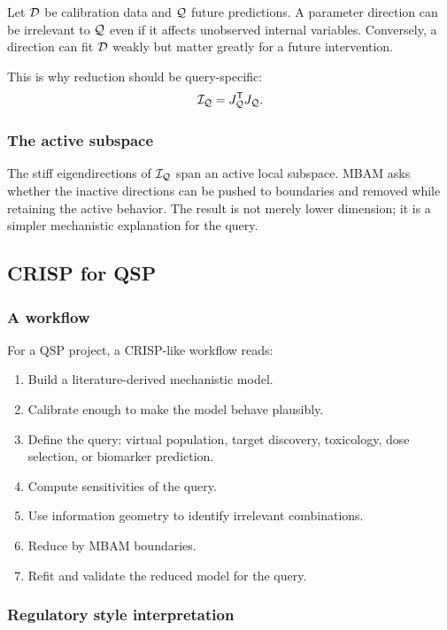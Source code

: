 Let \(\mathcal{D}\) be calibration data and \(\mathcal{Q}\) future predictions.  A parameter direction can be irrelevant to \(\mathcal{Q}\) even if it affects unobserved internal variables.  Conversely, a direction can fit \(\mathcal{D}\) weakly but matter greatly for a future intervention.

This is why reduction should be query-specific:
\[
  \mathcal{I}_{\mathcal{Q}}
  =
  J_{\mathcal{Q}}^{\mathsf{T}}J_{\mathcal{Q}}.
\]

\subsubsection*{The active subspace}

The stiff eigendirections of \(\mathcal{I}_{\mathcal{Q}}\) span an active local subspace.  MBAM asks whether the inactive directions can be pushed to boundaries and removed while retaining the active behavior.  The result is not merely lower dimension; it is a simpler mechanistic explanation for the query.

\subsection{CRISP for QSP}

\subsubsection*{A workflow}

For a QSP project, a CRISP-like workflow reads:
\begin{enumerate}[leftmargin=2em]
  \item Build a literature-derived mechanistic model.
  \item Calibrate enough to make the model behave plausibly.
  \item Define the query: virtual population, target discovery, toxicology, dose selection, or biomarker prediction.
  \item Compute sensitivities of the query.
  \item Use information geometry to identify irrelevant combinations.
  \item Reduce by MBAM boundaries.
  \item Refit and validate the reduced model for the query.
\end{enumerate}

\subsubsection*{Regulatory style interpretation}

